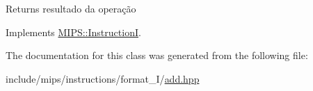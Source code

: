 \begin{DoxyReturn}{Returns}
resultado da operação 
\end{DoxyReturn}


Implements \hyperlink{classMIPS_1_1InstructionI_ae60fca5801bf5415cdff06d2aa11764f}{M\+I\+P\+S\+::\+InstructionI}.



The documentation for this class was generated from the following file\+:\begin{DoxyCompactItemize}
\item 
include/mips/instructions/format\+\_\+\+I/\hyperlink{add_8hpp}{add.\+hpp}\end{DoxyCompactItemize}
